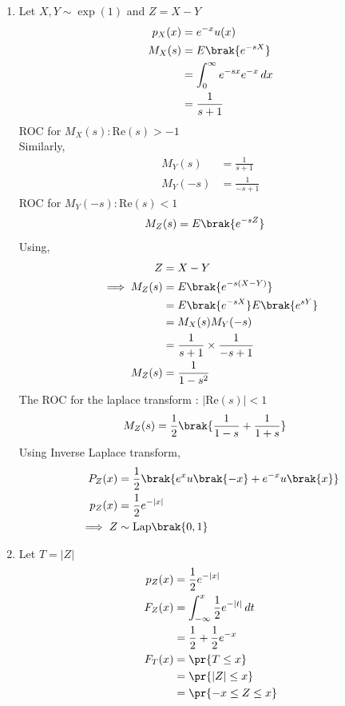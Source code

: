 \documentclass[journal,12pt,twocolumn]{IEEEtran}
\begin{document}
\begin{enumerate}
\item Let $X, Y \sim \exp(1)$ and $Z = X - Y$ 
\begin{align}
p_X(x) &= e^{-x}u(x) \\
M_X(s) &= E\brak{e^{-sX}} \\
&= \int_{0}^{\infty}e^{-sx} e^{-x} \,dx \\
&= \frac{1}{s + 1}
\end{align} 
ROC for $M_X(s):\text{Re}(s)>-1$ \\ 
Similarly,
\begin{align}
M_Y(s) &= \frac{1}{s + 1} \\
M_Y(-s) &= \frac{1}{-s + 1} 
\end{align}
ROC for $M_Y(-s):\text{Re}(s)<1$
\begin{align}
M_Z(s) &= E\brak{e^{-sZ}} 
\end{align}
Using,
\begin{align}
Z &= X - Y \label{eq:ST/2023/61/1} \\
\implies M_Z(s) &= E\brak{e^{-s(X-Y)}} \\
&= E\brak{e^{-sX}}E\brak{e^{sY}} \\
&= M_X(s)M_Y(-s) \\
&= \frac{1}{s+1}\times\frac{1}{-s+1} \\ 
M_Z(s) &= \frac{1}{1-s^2} 
\end{align}
The ROC for the laplace transform : $ |\text{Re}(s)|<1 $\\
\begin{align}
M_Z(s) &= \frac{1}{2}\brak{\frac{1}{1-s} + \frac{1}{1+s}} 
\end{align}
Using Inverse Laplace transform,
\begin{align}
P_Z(x) &= \frac{1}{2}\brak{ e^x u\brak{-x} + e^{-x} u\brak{x}} \\
p_Z(x) &=  \frac{1}{2} e^{-|x|} \\
\implies Z &\sim \mathrm{Lap}\brak{0, 1} 
\end{align}
\item Let $T = |Z|$
\begin{align}
p_Z(x) &= \frac{1}{2} e^{-|x|} \\
F_Z(x) &= \int_{-\infty}^{x} \frac{1}{2} e^{-|t|} \,dt \\
&= \frac{1}{2} + \frac{1}{2} e^{-x} \\
F_T(x) &= \pr{T \leq x} \\
&=\pr{|Z| \leq x} \\ 
&= \pr{-x \leq Z \leq x} \\

\end{align}
\end{enumerate}
\end{document}

